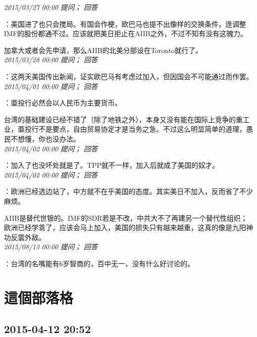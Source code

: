 \documentclass[twocolumn]{ctexart}
\begin{document}
\textit{\hfill\noindent\small 2015/03/27 00:00 提问； 回答}

：美国进了也只会搅局。有国会作梗，欧巴马也提不出像样的交换条件，连调整IMF的股份都通不过。应该就把美日拒止在AIIB之外，不过不知有没有这魄力。

加拿大或者会先申请，那么AIIB的北美分部设在Toronto就行了。\\

\textit{\hfill\noindent\small 2015/03/28 00:00 提问； 回答}

：这两天美国传出新闻，证实欧巴马有考虑过加入，但因国会不可能通过而作罢。\\

\textit{\hfill\noindent\small 2015/04/01 00:00 提问； 回答}

：亜投行必然会以人民币为主要货币。

台湾的基础建设已经不错了（除了地铁之外），本身又没有能在国际上竞争的重工业，亜投行不是要点，自由贸易协定才是当务之急。不过这么明显简单的道理，愚民不想懂，你也没办法。\\

\textit{\hfill\noindent\small 2015/04/02 00:00 提问； 回答}

：加入了也没坏处就是了。TPP就不一样，加入后就成了美国的奴才。\\

\textit{\hfill\noindent\small 2015/04/02 00:00 提问； 回答}

：欧洲已经选边站了，中方就不在乎美国的态度。其实美日不加入，反而省了不少麻烦。

AIIB是替代世银的。IMF的SDR若是不改，中共大不了再建另一个替代性组织；欧洲已经学乖了，应该会马上加入，美国的损失只有越来越重，这真的像是九阳神功反震外敌。\\

\textit{\hfill\noindent\small 2015/08/13 00:00 提问； 回答}

：台湾的名嘴能有6岁智商的，百中无一，没有什么好讨论的。\\


\section{這個部落格}
\subsection{2015-04-12 20:52}
\end{document}

